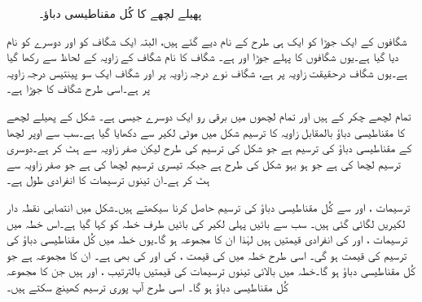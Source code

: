 \begin{figure}
\caption{پھیلے لچھے کا کُل مقناطیسی دباؤ۔}
\label{شکل_گھومتے_مشین_پھیلے_لچھے_کی_دباو}
\end{figure}


شگافوں کے ایک جوڑا کو ایک ہی طرح کے نام دیے گئے ہیں، البتہ ایک شگاف کو  اور دوسرے کو  نام دیا گیا ہے۔یوں شگافوں کا پہلے جوڑا   اور   ہے۔ شگاف   کا نام شگاف کے زاویہ کے لحاظ سے رکھا گیا ہے۔یوں  شگاف   درحقیقت  زاویہ پر ہے، شگاف  نوے درجہ زاویہ پر اور شگاف   ایک سو پینتیس درجہ زاویہ پر ہے۔اسی طرح   شگاف  کا جوڑا ہے۔

تمام لچھے  چکر کے ہیں اور تمام لچھوں میں  برقی رو  ایک دوسرے جیسی ہے۔  شکل    کے  پھیلے لچھے کا مقناطیسی دباؤ بالمقابل زاویہ کا ترسیم شکل   میں موٹی لکیر سے دکھایا گیا ہے۔سب سے اوپر لچھا    کے مقناطیسی دباؤ کی ترسیم ہے جو  شکل   کی ترسیم کی طرح لیکن صفر زاویہ سے  ہٹ کر ہے۔دوسری ترسیم لچھا  کی ہے جو ہو بہو شکل    کی طرح ہے جبکہ تیسری ترسیم  لچھا  کی ہے جو صفر زاویہ سے  ہٹ کر ہے۔ان تینوں ترسیمات کا انفرادی طول  ہے۔


ترسیمات ،  اور  سے کُل مقناطیسی دباؤ کی ترسیم   حاصل کرنا سیکھتے ہیں۔شکل  میں انتصابی  نقطہ دار لکیریں لگائی گئی ہیں۔ سب سے بائیں  پہلی لکیر کی بائیں طرف خطہ کو  کہا گیا ہے۔اس خطہ میں ترسیمات ،  اور  کی انفرادی قیمتیں  ہیں لہٰذا ان کا مجموعہ  ہو گا۔یوں خطہ  میں  کُل مقناطیسی دباؤ   کی ترسیم کی قیمت   ہو گی۔ اسی طرح خطہ  میں  کی قیمت  ،  کی  اور  کی بھی  ہے۔ ان کا مجموعہ   ہے جو کُل مقناطیسی دباؤ  ہو گا۔خطہ  میں  بالائی تینوں ترسیمات کی قیمتیں بالترتیب  ،  اور   ہیں جن کا مجموعہ   کُل مقناطیسی دباؤ ہو گا۔ اسی طرح آپ پوری ترسیم کھینچ سکتے ہیں۔


